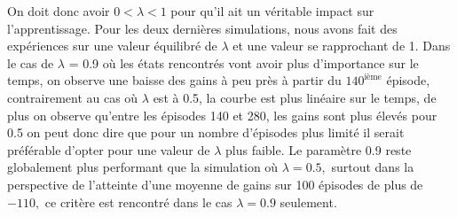 \documentclass[letterpaper,11pt]{article}
\begin{document}
\begin{enumerate}[label=(\alph*)]
On doit donc avoir $0 < \lambda < 1$ pour qu'il ait un véritable impact sur l'apprentissage.
Pour les deux dernières simulations, nous avons fait des expériences sur une valeur équilibré de $\lambda$ et une valeur se rapprochant de 1.
Dans le cas de $\lambda$ = 0.9 où les états rencontrés vont avoir plus d'importance sur le temps, on observe une baisse des gains à peu près à partir du $140^{\text{ième}}$ épisode, contrairement au cas où $\lambda$ est à 0.5, la courbe est plus linéaire sur le temps, de plus on observe qu'entre les épisodes 140 et 280, les gains sont plus élevés pour 0.5 on peut donc dire que pour un nombre d'épisodes plus limité il serait préférable d'opter pour une valeur de $\lambda$ plus faible. Le paramètre 0.9 reste globalement plus performant que la simulation où $\lambda = 0.5,$ surtout dans la perspective de l'atteinte d'une moyenne de gains sur 100 épisodes de plus de $-110,$ ce critère est rencontré dans le cas $\lambda=0.9$ seulement. 

\end{enumerate}
\end{document}
